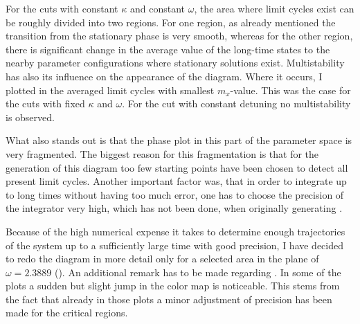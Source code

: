 For the cuts with constant $\kappa$ and constant $\omega$, the area where limit cycles exist can be roughly divided into two regions. For one region, as already mentioned the transition from the stationary phase is very smooth, whereas for the other region, there is significant change in the average value of the long-time states to the nearby parameter configurations where stationary solutions exist. Multistability has also its influence on the appearance of the diagram. Where it occurs, I plotted in  the averaged limit cycles with smallest $m_x$-value. This was the case for the cuts with fixed $\kappa$ and $\omega$. For the cut with constant detuning no multistability is observed.

What also stands out is that the phase plot in this part of the parameter space is very fragmented. The biggest reason for this fragmentation is that for the generation of this diagram too few starting points have been chosen to detect all present limit cycles. Another important factor was, that in order to integrate up to long times without having too much error, one has to choose the precision of the integrator very high, which has not been done, when originally generating . 

Because of the high numerical expense it takes to determine enough trajectories of the system up to a sufficiently large time with good precision, I have decided to redo the diagram in more detail only for a selected area in the plane of $\omega=2.3889$ (). An additional remark has to be made regarding . In some of the plots a sudden but slight jump in the color map is noticeable. This stems from the fact that already in those plots a minor adjustment of precision has been made for the critical regions. %

